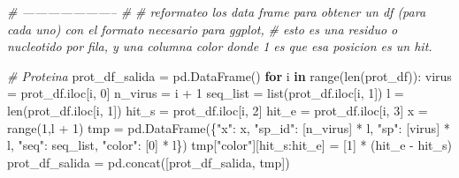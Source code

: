 \documentclass[11pt]{article}
\newenvironment{Shaded}{}{}
\newcommand{\KeywordTok}[1]{\textcolor[rgb]{0.00,0.44,0.13}{\textbf{{#1}}}}
\newcommand{\DecValTok}[1]{\textcolor[rgb]{0.25,0.63,0.44}{{#1}}}
\newcommand{\StringTok}[1]{\textcolor[rgb]{0.25,0.44,0.63}{{#1}}}
\newcommand{\CommentTok}[1]{\textcolor[rgb]{0.38,0.63,0.69}{\textit{{#1}}}}
\newcommand{\NormalTok}[1]{{#1}}
\newcommand{\ControlFlowTok}[1]{\textcolor[rgb]{0.00,0.44,0.13}{\textbf{{#1}}}}
\newcommand{\OperatorTok}[1]{\textcolor[rgb]{0.40,0.40,0.40}{{#1}}}
\newcommand{\BuiltInTok}[1]{{#1}}
\begin{document}
\begin{Shaded}
\begin{Highlighting}[]
\CommentTok{# ----------------------- #}
\CommentTok{# reformateo los data frame para obtener un df (para cada uno) con el formato necesario para ggplot,}
\CommentTok{# esto es una residuo o nucleotido por fila, y una columna color donde 1 es que esa posicion es un hit.}


\CommentTok{# Proteina}
\NormalTok{prot_df_salida }\OperatorTok{=}\NormalTok{ pd.DataFrame()}
\ControlFlowTok{for}\NormalTok{ i }\KeywordTok{in} \BuiltInTok{range}\NormalTok{(}\BuiltInTok{len}\NormalTok{(prot_df)):}
\NormalTok{    virus }\OperatorTok{=}\NormalTok{ prot_df.iloc[i, }\DecValTok{0}\NormalTok{]}
\NormalTok{    n_virus }\OperatorTok{=}\NormalTok{ i }\OperatorTok{+} \DecValTok{1}
\NormalTok{    seq_list }\OperatorTok{=} \BuiltInTok{list}\NormalTok{(prot_df.iloc[i, }\DecValTok{1}\NormalTok{])}
\NormalTok{    l }\OperatorTok{=} \BuiltInTok{len}\NormalTok{(prot_df.iloc[i, }\DecValTok{1}\NormalTok{])}
\NormalTok{    hit_s }\OperatorTok{=}\NormalTok{ prot_df.iloc[i, }\DecValTok{2}\NormalTok{]}
\NormalTok{    hit_e }\OperatorTok{=}\NormalTok{ prot_df.iloc[i, }\DecValTok{3}\NormalTok{]}
\NormalTok{    x }\OperatorTok{=} \BuiltInTok{range}\NormalTok{(}\DecValTok{1}\NormalTok{,l }\OperatorTok{+} \DecValTok{1}\NormalTok{)}
\NormalTok{    tmp }\OperatorTok{=}\NormalTok{ pd.DataFrame(\{}\StringTok{"x"}\NormalTok{: x, }\StringTok{"sp_id"}\NormalTok{: [n_virus] }\OperatorTok{*}\NormalTok{ l, }\StringTok{"sp"}\NormalTok{: [virus] }\OperatorTok{*}\NormalTok{ l, }\StringTok{"seq"}\NormalTok{: seq_list, }\StringTok{"color"}\NormalTok{: [}\DecValTok{0}\NormalTok{] }\OperatorTok{*}\NormalTok{ l\})}
\NormalTok{    tmp[}\StringTok{"color"}\NormalTok{][hit_s:hit_e] }\OperatorTok{=}\NormalTok{ [}\DecValTok{1}\NormalTok{] }\OperatorTok{*}\NormalTok{ (hit_e }\OperatorTok{-}\NormalTok{ hit_s)}
\NormalTok{    prot_df_salida }\OperatorTok{=}\NormalTok{ pd.concat([prot_df_salida, tmp])}


\end{Highlighting}
\end{Shaded}
\end{document}
